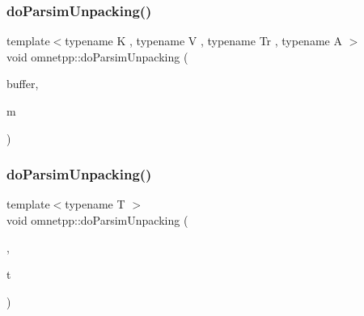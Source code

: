 \mbox{\label{namespaceomnetpp_a6fd2557203871e46db43fa9c63968117}} 
\subsubsection{\texorpdfstring{do\+Parsim\+Unpacking()}{doParsimUnpacking()}\hspace{0.1cm}{\footnotesize\ttfamily [4/5]}}
{\footnotesize\ttfamily template$<$typename K , typename V , typename Tr , typename A $>$ \\
void omnetpp\+::do\+Parsim\+Unpacking (\begin{DoxyParamCaption}\item[{omnetpp\+::c\+Comm\+Buffer $\ast$}]{buffer,  }\item[{std\+::map$<$ K, V, Tr, A $>$ \&}]{m }\end{DoxyParamCaption})}

\mbox{\label{namespaceomnetpp_a7336b297a32484942d52667dae7c7248}} 
\subsubsection{\texorpdfstring{do\+Parsim\+Unpacking()}{doParsimUnpacking()}\hspace{0.1cm}{\footnotesize\ttfamily [5/5]}}
{\footnotesize\ttfamily template$<$typename T $>$ \\
void omnetpp\+::do\+Parsim\+Unpacking (\begin{DoxyParamCaption}\item[{omnetpp\+::c\+Comm\+Buffer $\ast$}]{,  }\item[{T \&}]{t }\end{DoxyParamCaption})}

